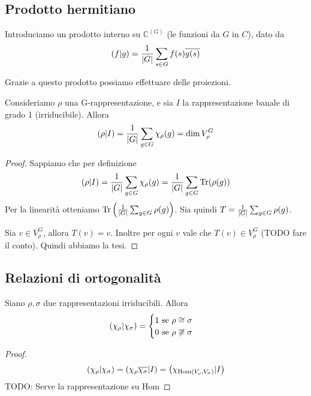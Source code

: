 \documentclass[a4paper,10pt,oneside]{math_article}
\newcommand{\herm}[2]{\left(#1 | #2\right)}
\newcommand{\id}{I}
\let\conj\overline
\begin{document}
    
    \subsection{Prodotto hermitiano}
    Introduciamo un prodotto interno su $\mathbb C^{(G)}$ (le funzioni da $G$ in $C$), dato da 
    \[
     \herm fg = \frac 1{\abs G} \sum_{s\in G} f(s)\conj{g(s)}
    \]
    
    Grazie a questo prodotto possiamo effettuare delle proiezioni.
    
    \begin{myexample}
     Consideriamo $\rho$ una G-rappresentazione, e sia $\id$ la rappresentazione banale di grado 1 (irriducibile). Allora 
     \[
      \herm \rho\id = \frac 1{\abs G}\sum_{g\in G} \chi_\rho(g) = \dim V_\rho^G
     \]    
    \end{myexample}
    \begin{proof}
     Sappiamo che per definizione
     \[
      \herm \rho\id = \frac 1{\abs G}\sum_{g\in G} \chi_\rho(g) = \frac 1{\abs G}\sum_{g\in G} \Tr(\rho(g)) 
     \]
     Per la linearità otteniamo $\operatorname{Tr}\left(\frac 1{\left|G\right|}\sum_{g\in G}\rho(g)\right)$. Sia quindi $T=\frac 1{\left|G\right|}\sum_{g\in G}\rho(g)$.
     
     Sia $v \in V^G_\rho$, allora $T(v)=v$. Inoltre per ogni $v$ vale che $T(v) \in V^G_\rho$ (TODO fare il conto). Quindi abbiamo la tesi.
     
    \end{proof}
   \subsection{Relazioni di ortogonalità}
    \begin{mytheorem}
     Siano $\rho,\sigma$ due rappresentazioni irriducibili. Allora
     \[
      \herm {\chi_\rho} {\chi_\sigma} = \begin{cases}
                           1 \mbox{ se } \rho \isom \sigma \\
                           0 \mbox{ se } \rho \not\isom \sigma
                          \end{cases}
     \]
    \end{mytheorem}
    \begin{proof}
     \[
      \herm {\chi_\rho}{\chi_\sigma}=\herm{\chi_\rho\conj{\chi_\sigma}}\id = \herm{\chi_{\Hom(V_\rho,V_\sigma)}}\id
     \]
     TODO: Serve la rappresentazione su Hom
    \end{proof}
    
\end{document}
